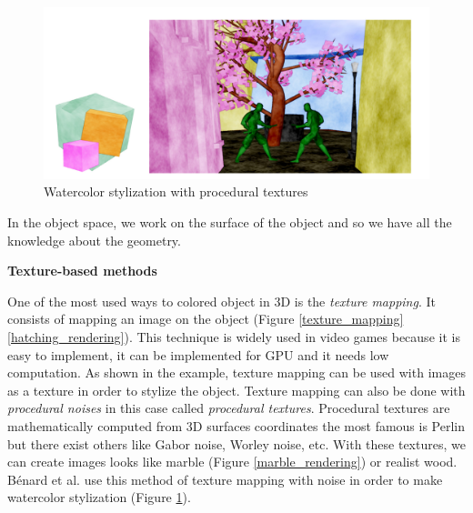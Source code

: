 \begin{figure}[H]
    \begin{center}
    \includegraphics[scale=0.3]{pics/watercolor_objspace.png}
    \end{center}
    \caption{Watercolor stylization with procedural textures \cite{benard_dynamic_2009}}
    \label{watercolor_rendering}
\end{figure}





In the object space, we work on the surface of the object and so we have all the knowledge about the geometry. \newline


\textbf{Texture-based methods}


One of the most used ways to colored object in 3D is the \textit{texture mapping}. It consists of mapping an image on the object (Figure \ref{texture_mapping}\ref{hatching_rendering}). This technique is widely used in video games because it is easy to implement, it can be implemented for GPU and it needs low computation. As shown in the example, texture mapping can be used with images as a texture in order to stylize the object\cite{praun_real-time_2001, klein_non-photorealistic_2000, freudenberg_walk-through_2001}. Texture mapping can also be done with \textit{procedural noises}\cite{perlin_improving_2002} in this case called \textit{procedural textures}. Procedural textures are mathematically computed from 3D surfaces coordinates the most famous is Perlin but there exist others like Gabor noise, Worley noise, etc. With these textures, we can create images looks like marble (Figure \ref{marble_rendering}) or realist wood. Bénard et al.\cite{benard_dynamic_2009, benard_dynamic_2010} use this method of texture mapping with noise in order to make watercolor stylization (Figure \ref{watercolor_rendering}). \newline

